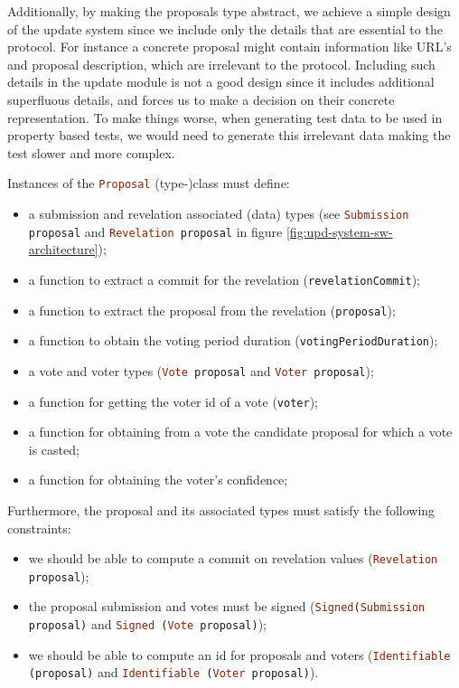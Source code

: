 Additionally, by making the proposals type abstract, we achieve a simple design
of the update system since we include only the details that are essential to
the protocol. For instance a concrete proposal might contain information like
URL's and proposal description, which are irrelevant to the protocol. Including
such details in the update module is not a good design since it includes
additional superfluous details, and forces us to make a decision on their
concrete representation. To make things worse, when
generating test data to be used in property based tests, we would need to
generate this irrelevant data making the test slower and more complex.

Instances of the \lstinline[language=Haskell]!Proposal! (type-)class must
define:
\begin{itemize}
	\item a submission and revelation associated (data) types (see
	\lstinline[language=Haskell]!Submission proposal! and
	\lstinline[language=Haskell]!Revelation proposal! in figure
	\ref{fig:upd-system-sw-architecture});
	\item a function to extract a commit for the revelation
	(\lstinline[language=Haskell]!revelationCommit!);
	\item a function to extract the proposal from the revelation
	(\lstinline[language=Haskell]!proposal!);
	\item a function to obtain the voting period duration
	(\lstinline[language=Haskell]!votingPeriodDuration!);
	\item a vote and voter types (\lstinline[language=Haskell]!Vote proposal!
	and
	\lstinline[language=Haskell]!Voter proposal!);
	\item a function for getting the voter id of a vote
	(\lstinline[language=Haskell]!voter!);
	\item a function for obtaining from a vote the candidate proposal for which
	a
	vote is
	casted;
	\item a function for obtaining the voter's confidence;
\end{itemize}
Furthermore, the proposal and its associated types must satisfy the following
constraints:
\begin{itemize}
	\item we should be able to compute a commit on revelation values
	(\lstinline[language=Haskell]!Revelation proposal!);
	\item the proposal submission and votes must be signed
	(\lstinline[language=Haskell]!Signed(Submission proposal)! and
	\lstinline[language=Haskell]!Signed (Vote proposal)!);
	\item we should be able to compute an id for proposals and voters
	(\lstinline[language=Haskell]!Identifiable (proposal)! and
	\lstinline[language=Haskell]!Identifiable (Voter proposal)!).
\end{itemize}


